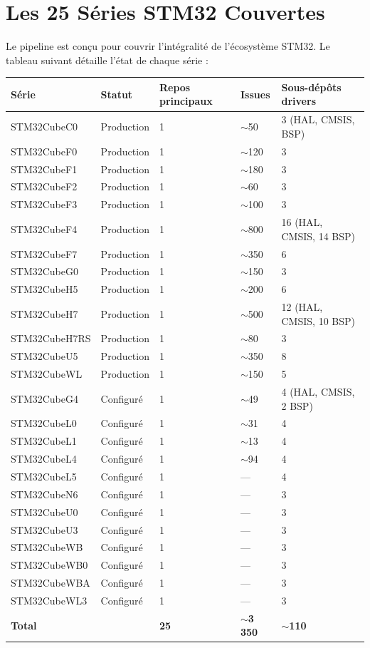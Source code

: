 \documentclass[12pt,a4paper]{report}
\begin{document}
\section{Les 25 Séries STM32 Couvertes}
\label{sec:25series}

Le pipeline est conçu pour couvrir l'intégralité de l'écosystème STM32. Le tableau suivant détaille l'état de chaque série :

\begin{longtable}{p{2.5cm}p{2cm}p{3cm}p{2cm}p{3cm}}
\toprule
\textbf{Série} & \textbf{Statut} & \textbf{Repos principaux} & \textbf{Issues} & \textbf{Sous-dépôts drivers} \\
\midrule
STM32CubeC0 & Production & 1 & $\sim$50 & 3 (HAL, CMSIS, BSP) \\
STM32CubeF0 & Production & 1 & $\sim$120 & 3 \\
STM32CubeF1 & Production & 1 & $\sim$180 & 3 \\
STM32CubeF2 & Production & 1 & $\sim$60 & 3 \\
STM32CubeF3 & Production & 1 & $\sim$100 & 3 \\
STM32CubeF4 & Production & 1 & $\sim$800 & 16 (HAL, CMSIS, 14 BSP) \\
STM32CubeF7 & Production & 1 & $\sim$350 & 6 \\
STM32CubeG0 & Production & 1 & $\sim$150 & 3 \\
STM32CubeH5 & Production & 1 & $\sim$200 & 6 \\
STM32CubeH7 & Production & 1 & $\sim$500 & 12 (HAL, CMSIS, 10 BSP) \\
STM32CubeH7RS & Production & 1 & $\sim$80 & 3 \\
STM32CubeU5 & Production & 1 & $\sim$350 & 8 \\
STM32CubeWL & Production & 1 & $\sim$150 & 5 \\
\midrule
STM32CubeG4 & Configuré & 1 & $\sim$49 & 4 (HAL, CMSIS, 2 BSP) \\
STM32CubeL0 & Configuré & 1 & $\sim$31 & 4 \\
STM32CubeL1 & Configuré & 1 & $\sim$13 & 4 \\
STM32CubeL4 & Configuré & 1 & $\sim$94 & 4 \\
STM32CubeL5 & Configuré & 1 & --- & 4 \\
STM32CubeN6 & Configuré & 1 & --- & 3 \\
STM32CubeU0 & Configuré & 1 & --- & 3 \\
STM32CubeU3 & Configuré & 1 & --- & 3 \\
STM32CubeWB & Configuré & 1 & --- & 3 \\
STM32CubeWB0 & Configuré & 1 & --- & 3 \\
STM32CubeWBA & Configuré & 1 & --- & 3 \\
STM32CubeWL3 & Configuré & 1 & --- & 3 \\
\midrule
\textbf{Total} & & \textbf{25} & $\sim$\textbf{3\,350} & $\sim$\textbf{110} \\
\bottomrule
\end{longtable}
\end{document}

